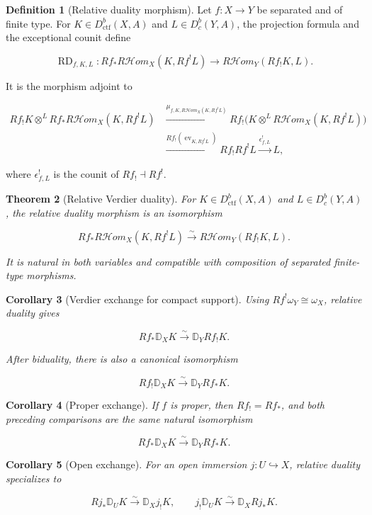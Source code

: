\documentclass[10pt]{article}
\newtheorem{theorem}{Theorem}[section]
\newtheorem{corollary}[theorem]{Corollary}
\theoremstyle{definition}
\newtheorem{definition}[theorem]{Definition}
\newcommand{\Dbc}{D^b_c}
\newcommand{\Dctf}{D^b_{\mathrm{ctf}}}
\newcommand{\RHom}{R\mathcal Hom}
\newcommand{\DD}{\mathbb D}
\begin{document}
\begin{definition}[Relative duality morphism]
\label{def:relative-duality}
Let \(f:X\to Y\) be separated and of finite type.  For
\(K\in\Dctf(X,A)\) and \(L\in\Dbc(Y,A)\), the projection formula and the
exceptional counit define

\[
 \operatorname{RD}_{f,K,L}:Rf_*\RHom_X(K,Rf^!L)
 \longrightarrow\RHom_Y(Rf_!K,L).
\]

It is the morphism adjoint to

\[
\begin{aligned}
 Rf_!K\otimes^LRf_*\RHom_X(K,Rf^!L)
 &\xrightarrow{\mu_{f,K,\RHom_X(K,Rf^!L)}}
 Rf_!\bigl(K\otimes^L\RHom_X(K,Rf^!L)\bigr)\\
 &\xrightarrow{Rf_!(\operatorname{ev}_{K,Rf^!L})}
 Rf_!Rf^!L
 \xrightarrow{\epsilon^!_{f,L}}L,
\end{aligned}
\]

where \(\epsilon^!_{f,L}\) is the counit of \(Rf_!\dashv Rf^!\).
\end{definition}

\begin{theorem}[Relative Verdier duality]
For \(K\in\Dctf(X,A)\) and \(L\in\Dbc(Y,A)\), the relative duality morphism
is an isomorphism

\[
 Rf_*\RHom_X(K,Rf^!L)
 \xrightarrow{\sim}\RHom_Y(Rf_!K,L).
\]

It is natural in both variables and compatible with composition of
separated finite-type morphisms.
\end{theorem}

\begin{corollary}[Verdier exchange for compact support]
Using \(Rf^!\omega_Y\cong\omega_X\), relative duality gives

\[
 Rf_*\DD_XK\xrightarrow{\sim}\DD_YRf_!K.
\]

After biduality, there is also a canonical isomorphism

\[
 Rf_!\DD_XK\xrightarrow{\sim}\DD_YRf_*K.
\]
\end{corollary}

\begin{corollary}[Proper exchange]
If \(f\) is proper, then \(Rf_!=Rf_*\), and both preceding comparisons are
the same natural isomorphism

\[
 Rf_*\DD_XK\xrightarrow{\sim}\DD_YRf_*K.
\]
\end{corollary}

\begin{corollary}[Open exchange]
For an open immersion \(j:U\hookrightarrow X\), relative duality specializes
to

\[
 Rj_*\DD_UK\xrightarrow{\sim}\DD_Xj_!K,
 \qquad
 j_!\DD_UK\xrightarrow{\sim}\DD_XRj_*K.
\]
\end{corollary}
\end{document}
